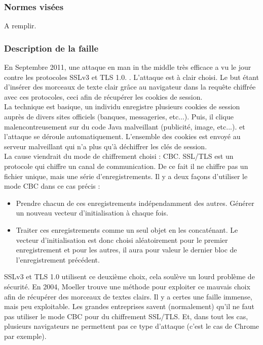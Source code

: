 \subsubsection{Normes visées}

A remplir.

\subsubsection{Description de la faille}

En Septembre 2011, une attaque en man in the middle très efficace a vu le jour contre les protocoles SSLv3 et TLS 1.0. \cite{ekr2011beast} \cite{imperial2011beast} \cite{goodin2011beast} \cite{gallagher2011beast}. L'attaque est à clair choisi. Le but étant d'insérer des morceaux de texte clair grâce au navigateur dans la requête chiffrée avec ces protocoles, ceci afin de récupérer les cookies de session.\\

La technique est basique, un individu enregistre plusieurs cookies de session auprès de divers sites officiels (banques, messageries, etc...). Puis, il clique malencontreusement sur du code Java malveillant (publicité, image, etc...). et l'attaque se déroule automatiquement. L'ensemble des cookies est envoyé au serveur malveillant qui n'a plus qu'à déchiffrer les clés de session.\\

La cause viendrait du mode de chiffrement choisi : CBC. SSL/TLS est un protocole qui chiffre un canal de communication. De ce fait il ne chiffre pas un fichier unique, mais une série d'enregistrements. Il y a deux façons d'utiliser le mode CBC dans ce cas précis :
\begin{itemize}
\item Prendre chacun de ces enregistrements indépendamment des autres. Générer un nouveau vecteur d'initialisation à chaque fois.
\item Traiter ces enregistrements comme un seul objet en les concaténant. Le vecteur d'initialisation est donc choisi aléatoirement pour le premier enregistrement et pour les autres, il aura pour valeur le dernier bloc de l'enregistrement précédent.\\

\end{itemize}

SSLv3 et TLS 1.0 utilisent ce deuxième choix, cela soulève un lourd problème de sécurité. En 2004, Moeller \cite{moeller2004cbc} trouve une méthode pour exploiter ce mauvais choix afin de récupérer des morceaux de textes clairs. Il y a certes une faille immense, mais peu exploitable. Les grandes entreprises savent (normalement) qu'il ne faut pas utiliser le mode CBC pour du chiffrement SSL/TLS. Et, dans tout les cas, plusieurs navigateurs ne permettent pas ce type d'attaque (c'est le cas de Chrome par exemple).

